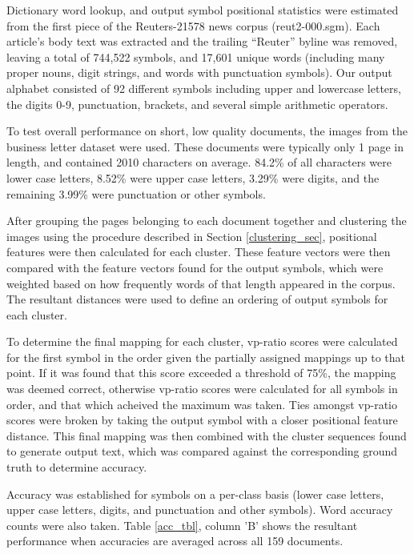 \documentclass[times, 10pt,twocolumn]{article}
\begin{document}
Dictionary word lookup, and output symbol positional statistics were estimated
from the first piece of the Reuters-21578 news corpus 
(reut2-000.sgm)\cite{lewis2004}.  Each article's body text was extracted and the
trailing ``Reuter'' byline was removed, leaving a total of 744,522 symbols, and
17,601 unique words (including many proper nouns, digit strings, and words with
punctuation symbols).  Our output alphabet consisted of 92 different symbols
including upper and lowercase letters, the digits 0-9, punctuation, brackets, 
and several simple arithmetic operators.

To test overall performance on short, low quality documents, the images from
the business letter dataset were used.  These documents were typically only 1
page in length, and contained 2010 characters on average.  84.2\% of all
characters were lower case letters, 8.52\% were upper case letters, 3.29\% were
digits, and the remaining 3.99\% were punctuation or other symbols.

After grouping the pages belonging to each document together and clustering 
the images using the procedure described in Section \ref{clustering_sec}, 
positional features were then calculated for each cluster.  These feature 
vectors were then compared with the feature vectors found for the output 
symbols, which were weighted based on how frequently words of that length 
appeared in the corpus.  The resultant distances were used to define an 
ordering of output symbols for each cluster.

To determine the final mapping for each cluster, vp-ratio scores were
calculated for the first symbol in the order given the partially assigned
mappings up to that point.  If it was found that this score exceeded a 
threshold of 75\%, the mapping was deemed correct, otherwise vp-ratio scores
were calculated for all symbols in order, and that which acheived the maximum
was taken.  Ties amongst vp-ratio scores were broken by taking the output
symbol with a closer positional feature distance.  This final mapping was then
combined with the cluster sequences found to generate output text, which was
compared against the corresponding ground truth to determine accuracy.

Accuracy was established for symbols on a per-class basis (lower case letters, 
upper case letters, digits, and punctuation and other symbols).  Word accuracy
counts were also taken.  Table \ref{acc_tbl}, column 'B' shows the 
resultant performance when accuracies are averaged across all 159 documents.
\end{document}
